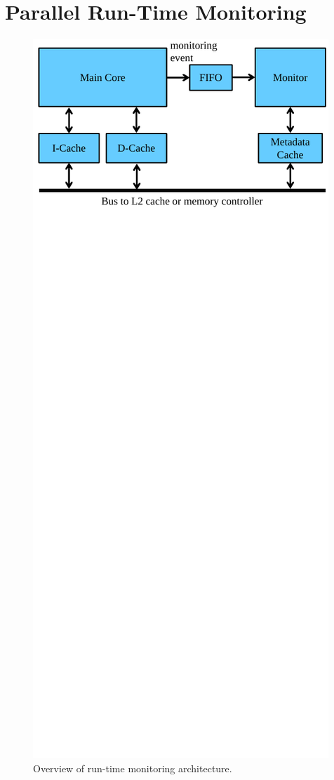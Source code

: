 \section{Parallel Run-Time Monitoring}
\label{sec:monitoring}

\begin{figure}
  \begin{center}
    \includegraphics[width=\columnwidth]{figs/monitoring_architecture.pdf}
    \vspace{-0.2in}
    \caption{Overview of run-time monitoring architecture.}
    \label{fig:arch.overview} 
    \vspace{-0.1in}
  \end{center}
\end{figure}

